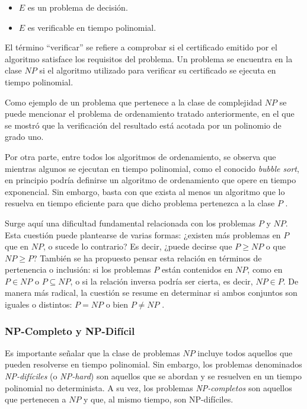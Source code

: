 \documentclass[12pt,titlepage,twoside,openright]{book}
\begin{document}
\begin{itemize}
	\item \(E\) es un problema de decisión.
	\item \(E\) es verificable en tiempo polinomial.
\end{itemize}

El término “verificar” se refiere a comprobar si el certificado emitido por el algoritmo satisface los requisitos del problema. Un problema se encuentra en la clase \(NP\) si el algoritmo utilizado para verificar su certificado se ejecuta en tiempo polinomial.

Como ejemplo de un problema que pertenece a la clase de complejidad \(NP\) se puede mencionar el problema de ordenamiento tratado anteriormente, en el que se mostró que la verificación del resultado está acotada por un polinomio de grado uno.

Por otra parte, entre todos los algoritmos de ordenamiento, se observa que mientras algunos se ejecutan en tiempo polinomial, como el conocido \emph{bubble sort}, en principio podría definirse un algoritmo de ordenamiento que opere en tiempo exponencial. Sin embargo, basta con que exista al menos un algoritmo que lo resuelva en tiempo eficiente para que dicho problema pertenezca a la clase \(P\) \citep{Flores2014}.

Surge aquí una dificultad fundamental relacionada con los problemas \(P\) y \(NP\). Esta cuestión puede plantearse de varias formas: ¿existen más problemas en \(P\) que en \(NP\), o sucede lo contrario? Es decir, ¿puede decirse que \(P \geq NP\) o que \(NP \geq P\)? También se ha propuesto pensar esta relación en términos de pertenencia o inclusión: si los problemas \(P\) están contenidos en \(NP\), como en \(P \in NP\) o \(P \subseteq NP\), o si la relación inversa podría ser cierta, es decir, \(NP \in P\). De manera más radical, la cuestión se resume en determinar si ambos conjuntos son iguales o distintos: \(P = NP\) o bien \(P \neq NP\) \citep{maldonado2013problema}.


\subsubsection{NP-Completo y NP-Difícil}

Es importante señalar que la clase de problemas \(NP\) incluye todos aquellos que pueden resolverse en tiempo polinomial. Sin embargo, los problemas denominados \emph{NP-difíciles} (o \emph{NP-hard}) son aquellos que se abordan y se resuelven en un tiempo polinomial no determinista. A su vez, los problemas \emph{NP-completos} son aquellos que pertenecen a \(NP\) y que, al mismo tiempo, son NP-difíciles.
\end{document}
